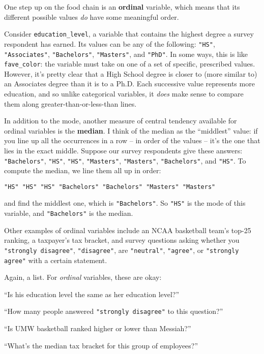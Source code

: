 One step up on the food chain is an \textbf{ordinal} variable, which means that
its different possible values \textit{do} have some meaningful order.

Consider \texttt{education\_level}, a variable that contains the highest degree
a survey respondent has earned. Its values can be any of the following:
\texttt{"HS"}, \texttt{"Associates"}, \texttt{"Bachelors"}, \texttt{"Masters"},
and \texttt{"PhD"}. In some ways, this is like \texttt{fave\_color}: the
variable must take on one of a set of specific, prescribed values. However,
it's pretty clear that a High School degree is closer to (more similar to) an
Associates degree than it is to a Ph.D. Each successive value represents more
education, and so unlike categorical variables, it \textit{does} make sense to
compare them along greater-than-or-less-than lines.


In addition to the mode, another measure of central tendency available for
ordinal variables is the \textbf{median}. I think of the median as the
``middlest'' value: if you line up all the occurrences in a row -- in order of
the values -- it's the one that lies in the exact middle. Suppose our survey
respondents give these answers: \texttt{"Bachelors"}, \texttt{"HS"},
\texttt{"HS"}, \texttt{"Masters"}, \texttt{"Masters"}, \texttt{"Bachelors"},
and \texttt{"HS"}. To compute the median, we line them all up in order:

\begin{center}
\small
\texttt{"HS"  "HS"  "HS"  "Bachelors"  "Bachelors"  "Masters"  "Masters"}
\end{center}

and find the middlest one, which is \texttt{"Bachelors"}. So \texttt{"HS"} is
the mode of this variable, and \texttt{"Bachelors"} is the median.

Other examples of ordinal variables include an NCAA basketball team's top-25
ranking, a taxpayer's tax bracket, and survey questions asking whether you
\texttt{"strongly disagree"}, \texttt{"disagree"}, are \texttt{"neutral"},
\texttt{"agree"}, or \texttt{"strongly agree"} with a certain statement.

Again, a list. For \textit{ordinal} variables, these are okay:

\begin{compactitem}
\item[\leftthumbsup] ``Is his education level the same as her education level?''
\item[\leftthumbsup] ``How many people answered \texttt{"strongly disagree"} to
this question?''
\item[\leftthumbsup] ``Is UMW basketball ranked higher or lower than Messiah?''
\item[\leftthumbsup] ``What's the median tax bracket for this group of
employees?''
\end{compactitem}

